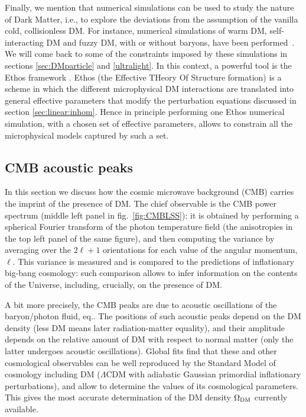 \medskip

Finally, we mention that numerical simulations can be used to study the nature of Dark Matter, i.e., to explore the deviations from the assumption of the vanilla cold, collisionless DM. For instance, numerical simulations of warm DM, self-interacting DM and fuzzy DM, with or without baryons, have been performed~\cite{Sims_alt_DM}. 
We will come back to some of the constraints imposed by these simulations in sections \ref{sec:DMparticle} and \ref{ultralight}.
In this context, a powerful tool is the {\sc Ethos} framework \cite{ETHOS}. {\sc Ethos} (the Effective THeory Of Structure formation) is a scheme in which the different microphysical DM interactions are translated into general effective parameters that modify the perturbation equations discussed in section \ref{sec:linear:inhom}. Hence in principle performing one {\sc Ethos} numerical simulation, with a chosen set of effective parameters, allows to constrain all the microphysical models captured by such a set.



\subsection{CMB acoustic peaks}\label{sec:CMB}
In this section we discuss how the cosmic microwave background (CMB) carries the imprint of the presence of DM. 
The chief observable is the CMB power spectrum (middle left panel in fig.~\ref{fig:CMBLSS}): it is 
obtained by performing a spherical Fourier transform of the photon temperature field (the anisotropies in the top left panel of the same figure), 
and then computing the variance by averaging over the $2\ell+1$ orientations for each value of the angular momentum, $\ell$.
This variance is measured and is compared to the predictions of inflationary big-bang cosmology:
such comparison allows to infer information on the contents of the Universe, including, crucially, on the presence of DM.

\smallskip


A bit more precisely, the CMB peaks are due to acoustic oscillations of the baryon/photon fluid, eq.. 
The positions of such acoustic peaks depend on the DM density (less DM means later radiation-matter equality), and their amplitude depends on the relative amount of DM with respect to normal matter (only the latter undergoes acoustic oscillations).
Global fits find that these and other cosmological observables can be well reproduced by the Standard Model of cosmology including DM 
($\Lambda$CDM with adiabatic Gaussian primordial inflationary perturbations), and allow to determine the values of its cosmological parameters. 
This gives the most accurate determination of the DM density $\Omega_{\rm DM}$ currently available.

